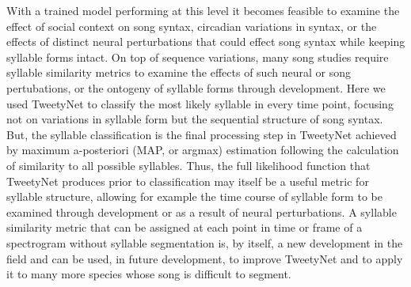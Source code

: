 \documentclass[10pt,letterpaper]{article}
\newcommand{\tododnor}[1]{
\todo[bordercolor=orange, color=orange!40, size=\small]{#1}
}
\begin{document}
With a trained model performing at this level it becomes feasible to examine the effect of social context on song syntax, circadian variations in syntax, or the effects of distinct neural perturbations that could effect song syntax while keeping syllable forms intact. 
On top of sequence variations, many song studies require syllable similarity metrics to examine the effects of such neural or song pertubations, or the ontogeny of syllable forms through development. 
Here we used TweetyNet to classify the most likely syllable in every time point, focusing not on variations in syllable form but the sequential structure of song syntax. But, the syllable classification is the final processing step in TweetyNet achieved by maximum a-posteriori (MAP, or argmax) estimation following the calculation of similarity to all possible syllables. Thus, the full likelihood function that TweetyNet produces prior to classification may itself be a useful metric for syllable structure, allowing for example the time course of syllable form to be examined through development or as a result of neural perturbations. A syllable similarity metric that can be assigned at each point in time or frame of a spectrogram without syllable segmentation is, by itself, a new development in the field and can be used, in future development, to improve TweetyNet and to apply it to many more species whose song is difficult to segment. %
\end{document}
